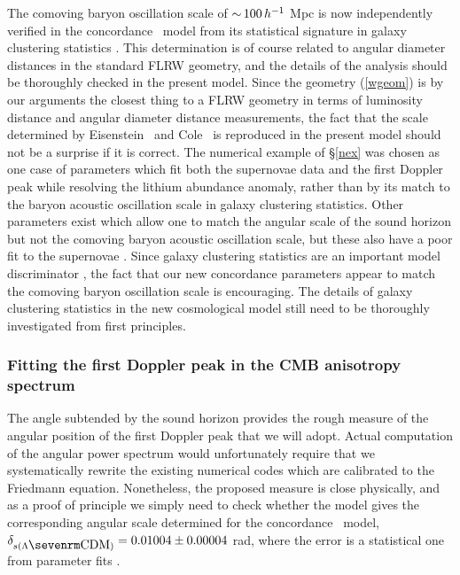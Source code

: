 \documentclass[12pt]{article}
\begin{document}
The comoving baryon oscillation scale of
$\mathop{\sim}\limits100\,h^{-1}$ Mpc is now independently verified in the concordance
\LCDM\ model from its statistical signature in galaxy clustering statistics
\cite{bao}. This determination is of course related to angular
diameter distances in the standard FLRW geometry, and the details of the
analysis should be thoroughly checked in the present model. Since the geometry
(\ref{wgeom}) is by our arguments the closest thing to a FLRW geometry in
terms of luminosity distance and angular diameter distance measurements,
the fact that the scale determined by Eisenstein \etal\ and Cole \etal\
is reproduced in
the present model should not be a surprise if it is
correct. The numerical example of \S\ref{nex} was chosen as one case of
parameters which fit both the supernovae data and the first Doppler peak
while resolving the lithium abundance anomaly, rather than by its match to
the baryon acoustic oscillation scale in galaxy clustering statistics.
Other parameters exist which
allow one to match the angular scale of the sound horizon but not the
comoving baryon acoustic oscillation scale, but these also have a poor
fit to the supernovae \cite{paper2}. Since galaxy clustering statistics are
an important model discriminator \cite{Blanchard}, the fact that our
new concordance parameters appear to match the comoving baryon oscillation
scale is encouraging. The details of galaxy clustering statistics in the
new cosmological model still need to be thoroughly investigated from first
principles.

\subsubsection{Fitting the first Doppler peak in the CMB anisotropy
spectrum\br}\br
The angle subtended by the sound horizon provides the rough measure of the
angular position of the first Doppler peak that we will adopt. Actual
computation of the angular power spectrum would unfortunately require
that we systematically rewrite the existing numerical codes which are
calibrated to the Friedmann equation. Nonetheless, the proposed measure
is close physically, and as a proof of principle we simply need to check
whether the model gives the corresponding angular scale determined for the
concordance \LCDM\ model, $\de\Z{s\lcdm}=0.01004\pm0.00004$ rad, where the
error is a statistical one from parameter fits \cite{wmap}.
\end{document}
